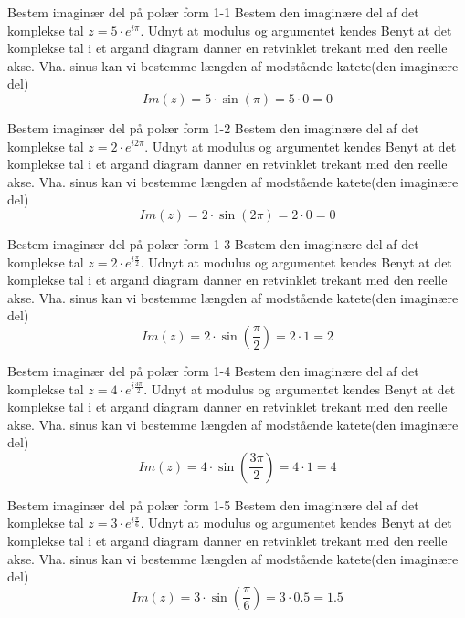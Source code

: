 \documentclass{article}
\begin{document}
\tableofcontents
\newpage
\begin{exercise}{Bestem imaginær del på polær form 1-1}
Bestem den imaginære del af det komplekse tal $z = 5 \cdot e^{i \pi}$.
\hint
Udnyt at modulus og argumentet kendes
\hint
Benyt at det komplekse tal i et argand diagram danner en retvinklet trekant med den reelle akse.
\hint
Vha. sinus kan vi bestemme længden af modstående katete(den imaginære del)
\[Im(z) = 5 \cdot \sin(\pi) = 5 \cdot 0 = 0
\]
\end{exercise}
\newpage
\begin{exercise}{Bestem imaginær del på polær form 1-2}
Bestem den imaginære del af det komplekse tal $z = 2 \cdot e^{i 2\pi}$.
\hint
Udnyt at modulus og argumentet kendes
\hint
Benyt at det komplekse tal i et argand diagram danner en retvinklet trekant med den reelle akse.
\hint
Vha. sinus kan vi bestemme længden af modstående katete(den imaginære del)
\[Im(z) = 2 \cdot \sin(2\pi) = 2 \cdot 0 = 0
\]
\end{exercise}
\newpage
\begin{exercise}{Bestem imaginær del på polær form 1-3}
Bestem den imaginære del af det komplekse tal $z = 2 \cdot e^{i \frac{\pi}{2}}$.
\hint
Udnyt at modulus og argumentet kendes
\hint
Benyt at det komplekse tal i et argand diagram danner en retvinklet trekant med den reelle akse.
\hint
Vha. sinus kan vi bestemme længden af modstående katete(den imaginære del)
\[Im(z) = 2 \cdot \sin\left(\frac{\pi}{2}\right) = 2 \cdot 1 = 2
\]
\end{exercise}
\newpage
\begin{exercise}{Bestem imaginær del på polær form 1-4}
Bestem den imaginære del af det komplekse tal $z = 4 \cdot e^{i \frac{3 \pi}{2}}$.
\hint
Udnyt at modulus og argumentet kendes
\hint
Benyt at det komplekse tal i et argand diagram danner en retvinklet trekant med den reelle akse.
\hint
Vha. sinus kan vi bestemme længden af modstående katete(den imaginære del)
\[Im(z) = 4 \cdot \sin\left(\frac{3 \pi}{2}\right) = 4 \cdot 1 = 4
\]
\end{exercise}
\newpage
\begin{exercise}{Bestem imaginær del på polær form 1-5}
Bestem den imaginære del af det komplekse tal $z = 3 \cdot e^{i \frac{\pi}{6}}$.
\hint
Udnyt at modulus og argumentet kendes
\hint
Benyt at det komplekse tal i et argand diagram danner en retvinklet trekant med den reelle akse.
\hint
Vha. sinus kan vi bestemme længden af modstående katete(den imaginære del)
\[Im(z) = 3 \cdot \sin\left(\frac{\pi}{6}\right) = 3 \cdot 0.5 = 1.5
\]
\end{exercise}
\end{document}
